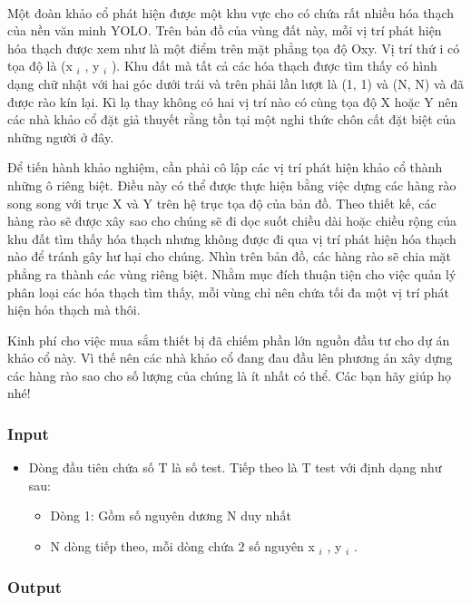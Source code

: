 

 

Một đoàn khảo cổ phát hiện được một khu vực cho có chứa rất nhiều hóa thạch của nền văn minh YOLO. Trên bản đồ của vùng đất này, mỗi vị trí phát hiện hóa thạch được xem như là một điểm trên mặt phẳng tọa độ Oxy. Vị trí thứ i có tọa độ là (x $_ i $ , y $_ i $ ). Khu đất mà tất cả các hóa thạch được tìm thấy có hình dạng chữ nhật với hai góc dưới trái và trên phải lần lượt là (1, 1) và (N, N) và đã được rào kín lại. Kì lạ thay không có hai vị trí nào có cùng tọa độ X hoặc Y nên các nhà khảo cổ đặt giả thuyết rằng tồn tại một nghi thức chôn cất đặt biệt của những người ở đây.

Để tiến hành khảo nghiệm, cần phải cô lập các vị trí phát hiện khảo cổ thành những ô riêng biệt. Điều này có thể được thực hiện bằng việc dựng các hàng rào song song với trục X và Y trên hệ trục tọa độ của bản đồ. Theo thiết kế, các hàng rào sẽ được xây sao cho chúng sẽ đi dọc suốt chiều dài hoặc chiều rộng của khu đất tìm thấy hóa thạch nhưng không được đi qua vị trí phát hiện hóa thạch nào để tránh gây hư hại cho chúng. Nhìn trên bản đồ, các hàng rào sẽ chia mặt phẳng ra thành các vùng riêng biệt. Nhằm mục đích thuận tiện cho việc quản lý phân loại các hóa thạch tìm thấy, mỗi vùng chỉ nên chứa tối đa một vị trí phát hiện hóa thạch mà thôi.

Kinh phí cho việc mua sắm thiết bị đã chiếm phần lớn nguồn đầu tư cho dự án khảo cổ này. Vì thế nên các nhà khảo cổ đang đau đầu lên phương án xây dựng các hàng rào sao cho số lượng của chúng là ít nhất có thể. Các bạn hãy giúp họ nhé!
\begin{itemize}
\end{itemize}

\subsubsection{Input}
\begin{itemize}
	\item Dòng đầu tiên chứa số T là số test. Tiếp theo là T test với định dạng như sau:
\begin{itemize}
	\item Dòng 1: Gồm số nguyên dương N duy nhất
	\item N dòng tiếp theo, mỗi dòng chứa 2 số nguyên x $_ i $ , y $_ i $ .
\end{itemize}
\end{itemize}

\subsubsection{Output}


